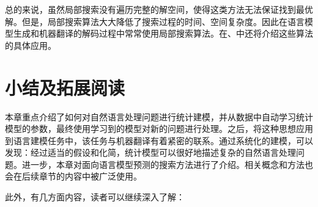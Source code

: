 \parinterval 总的来说，虽然局部搜索没有遍历完整的解空间，使得这类方法无法保证找到最优解。但是，局部搜索算法大大降低了搜索过程的时间、空间复杂度。因此在语言模型生成和机器翻译的解码过程中常常使用局部搜索算法。在{\chapterseven}、{\chapterten}中还将介绍这些算法的具体应用。


\sectionnewpage
\section{小结及拓展阅读} \label{sec2:summary}

\parinterval 本章重点介绍了如何对自然语言处理问题进行统计建模，并从数据中自动学习统计模型的参数，最终使用学习到的模型对新的问题进行处理。之后，将这种思想应用到语言建模任务中，该任务与机器翻译有着紧密的联系。通过系统化的建模，可以发现：经过适当的假设和化简，统计模型可以很好地描述复杂的自然语言处理问题。进一步，本章对面向语言模型预测的搜索方法进行了介绍。相关概念和方法也会在后续章节的内容中被广泛使用。

\parinterval 此外，有几方面内容，读者可以继续深入了解：

